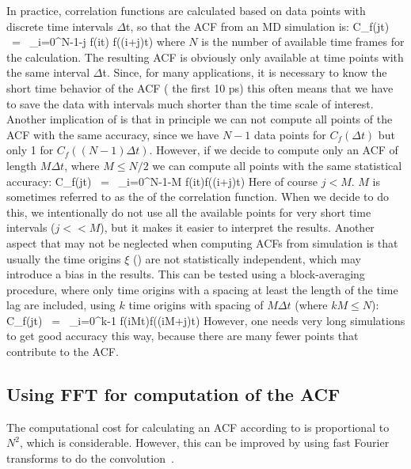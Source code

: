 In practice, correlation functions are calculated based on data points with
discrete time intervals {$\Delta$t}, so that the ACF from an MD simulation is:
\beq
C_f(j\Delta t)  ~=~     \sum_{i=0}^{N-1-j} f(i\Delta t) f((i+j)\Delta t)
\label{eqn:corrmd}
\eeq
where $N$ is the number of available time frames for the calculation.
The resulting ACF is
obviously only available at time points with the same interval {$\Delta$t}.
Since, for many applications, it is necessary to know the short time behavior
of the ACF ({\eg} the first 10 ps) this often means that we have to save the
data with intervals much shorter than the time scale of interest.
Another implication of  is that in principle we can not compute
all points of the ACF with the same accuracy, since we have $N-1$ data points
for $C_f(\Delta t)$ but only 1 for $C_f((N-1)\Delta t)$. However, if we decide to
compute only an ACF of length $M\Delta t$, where $M \leq N/2$ we can compute 
all points with the same statistical accuracy:
\beq
C_f(j\Delta t)  ~=~ \sum_{i=0}^{N-1-M} f(i\Delta t)f((i+j)\Delta t)
\eeq
Here of course $j < M$.
$M$ is sometimes referred to as the  of the correlation function. 
When we decide to do this, we intentionally do not use all the available points
for very short time intervals ($j << M$), but it makes it easier to interpret
the results.
Another aspect that may not be neglected when computing
ACFs from simulation is that usually the time origins $\xi$ ()
are not statistically independent, which may introduce a bias in the results.
This can be tested using a block-averaging procedure, where only time origins
with a spacing at least the length of the time lag are included, {\eg} using 
$k$ time origins with spacing of $M\Delta t$ (where $kM \leq N$):
\beq
C_f(j\Delta t)  ~=~ \sum_{i=0}^{k-1} f(iM\Delta t)f((iM+j)\Delta t)
\eeq
However, one
needs very long simulations to get good accuracy this way, because there are 
many fewer points that contribute to the ACF.

\subsection{Using FFT for computation of the ACF}
The computational cost for calculating an ACF according to 
is proportional to $N^2$, which is considerable. However, this can be improved
by using fast Fourier transforms to do the convolution~\cite{Allen87}.

